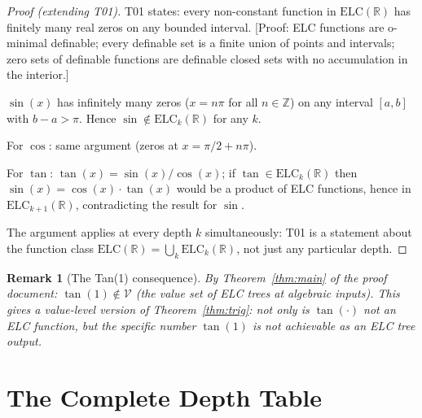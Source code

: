 \documentclass[11pt]{article}
\newtheorem{remark}[theorem]{Remark}
\begin{document}
\begin{proof}[Proof (extending T01)]
T01 states: every non-constant function in $\mathrm{ELC}(\mathbb{R})$ has finitely many
real zeros on any bounded interval. [Proof: ELC functions are o-minimal definable;
every definable set is a finite union of points and intervals; zero sets of definable
functions are definable closed sets with no accumulation in the interior.]

$\sin(x)$ has infinitely many zeros ($x = n\pi$ for all $n \in \mathbb{Z}$)
on any interval $[a,b]$ with $b - a > \pi$. Hence $\sin \notin \mathrm{ELC}_k(\mathbb{R})$
for any $k$.

For $\cos$: same argument (zeros at $x = \pi/2 + n\pi$).

For $\tan$: $\tan(x) = \sin(x)/\cos(x)$; if $\tan \in \mathrm{ELC}_k(\mathbb{R})$
then $\sin(x) = \cos(x) \cdot \tan(x)$ would be a product of ELC functions,
hence in $\mathrm{ELC}_{k+1}(\mathbb{R})$, contradicting the result for $\sin$.

The argument applies at every depth $k$ simultaneously: T01 is a statement about
the function class $\mathrm{ELC}(\mathbb{R}) = \bigcup_k \mathrm{ELC}_k(\mathbb{R})$,
not just any particular depth.
\end{proof}

\begin{remark}[The Tan(1) consequence]
By Theorem~\ref{thm:main} of the proof document: $\tan(1) \notin \mathcal{V}$
(the value set of ELC trees at algebraic inputs). This gives a \emph{value-level}
version of Theorem~\ref{thm:trig}: not only is $\tan(\cdot)$ not an ELC function,
but the specific number $\tan(1)$ is not achievable as an ELC tree output.
\end{remark}

\section{The Complete Depth Table}
\label{sec:table}
\end{document}
